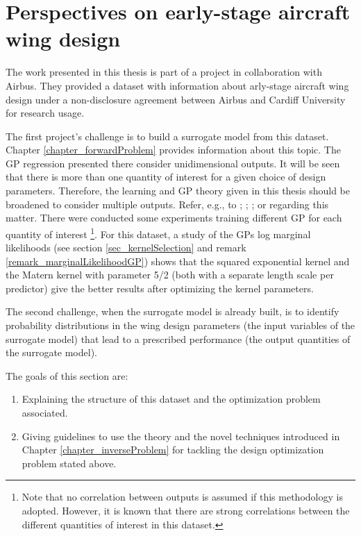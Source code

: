 \chapter{Perspectives on early-stage aircraft wing design} \label{chapter_AirBusData} 

The work presented in this thesis is part of a project in collaboration with Airbus. 
They provided a dataset with information about arly-stage aircraft wing design under a non-disclosure agreement between Airbus and Cardiff University for research usage.

The first project's challenge is to build a surrogate model from this dataset. 
Chapter \ref{chapter_forwardProblem} provides information about this topic.
The GP regression presented there consider unidimensional outputs.
It will be seen that there is more than one quantity of interest for a given choice of design parameters.
Therefore, the learning and GP theory given in this thesis should be broadened to consider multiple outputs.
Refer, e.g., to \textcite{micchelli2005}; \textcite{carmeli2006}; \textcite{bilionis2013}; or \textcite{alvarez2012} regarding this matter.
There were conducted some experiments training different GP for each quantity of interest
\footnote{Note that no correlation between outputs is assumed if this methodology is adopted. However, it is known that there are strong correlations between the different quantities of interest in this dataset.}.
For this dataset, a study of the GPs log marginal likelihoods (see section \ref{sec_kernelSelection} and remark \ref{remark_marginalLikelihoodGP}) shows that the squared exponential kernel and the Matern kernel with parameter 5/2 (both with a separate length scale per predictor) give the better results after optimizing the kernel parameters.

The second challenge, when the surrogate model is already built, is to identify probability distributions in the wing design parameters (the input variables of the surrogate model) that lead to a prescribed performance (the output quantities of the surrogate model).

The goals of this section are:
\begin{enumerate}
\item Explaining the structure of this dataset and the optimization problem associated.
\item Giving guidelines to use the theory and the novel techniques introduced in Chapter \ref{chapter_inverseProblem} for tackling the design optimization problem stated above.
\end{enumerate}

